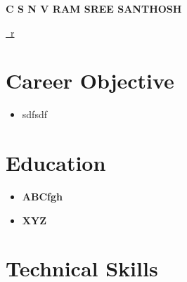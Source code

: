 \documentclass[letterpaper,5pt]{article}
\begin{document}
    
    \begin{center}
      \textbf{\Huge \scshape C S N V RAM SREE SANTHOSH} \\ \vspace{5pt}
      
      \href{mailto:r}{\raisebox{-0.05\height}\faEnvelope \ r} 
       \
       \
       \
    \end{center}
    
      \section{Career Objective}
        \begin{itemize}[leftmargin=0.15in, label={}]
          \item{sdfsdf}
        \end{itemize}
    
    \section{Education}
      
      
        \begin{itemize}[leftmargin=0.15in, label={}]
        \item[]
          \textbf{ ABCfgh } \hfill  \\
          \textit{    } \hfill  
        \end{itemize}
        \vspace{-15pt}
      
        \begin{itemize}[leftmargin=0.15in, label={}]
        \item[]
          \textbf{ XYZ } \hfill  \\
          \textit{    } \hfill  
        \end{itemize}
        \vspace{-15pt}
      
      \vspace{10mm}
    
    \vspace*{-10.5mm}  

    
    \section{Technical Skills}
    
\end{document}
